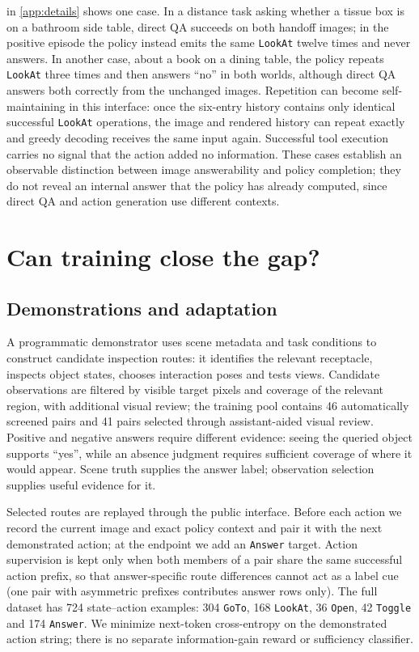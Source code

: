 \documentclass{article}
\begin{document}
 in \cref{app:details} shows one case. In a distance task asking whether a tissue box is on a bathroom side table, direct QA succeeds on both handoff images; in the positive episode the policy instead emits the same \texttt{LookAt} twelve times and never answers. In another case, about a book on a dining table, the policy repeats \texttt{LookAt} three times and then answers ``no'' in both worlds, although direct QA answers both correctly from the unchanged images. Repetition can become self-maintaining in this interface: once the six-entry history contains only identical successful \texttt{LookAt} operations, the image and rendered history can repeat exactly and greedy decoding receives the same input again. Successful tool execution carries no signal that the action added no information. These cases establish an observable distinction between image answerability and policy completion; they do not reveal an internal answer that the policy has already computed, since direct QA and action generation use different contexts.

\section{Can training close the gap?}
\label{sec:training}

\subsection{Demonstrations and adaptation}
A programmatic demonstrator uses scene metadata and task conditions to construct candidate inspection routes: it identifies the relevant receptacle, inspects object states, chooses interaction poses and tests views. Candidate observations are filtered by visible target pixels and coverage of the relevant region, with additional visual review; the training pool contains 46 automatically screened pairs and 41 pairs selected through assistant-aided visual review. Positive and negative answers require different evidence: seeing the queried object supports ``yes'', while an absence judgment requires sufficient coverage of where it would appear. Scene truth supplies the answer label; observation selection supplies useful evidence for it.

Selected routes are replayed through the public interface. Before each action we record the current image and exact policy context and pair it with the next demonstrated action; at the endpoint we add an \texttt{Answer} target. Action supervision is kept only when both members of a pair share the same successful action prefix, so that answer-specific route differences cannot act as a label cue (one pair with asymmetric prefixes contributes answer rows only). The full dataset has 724 state--action examples: 304 \texttt{GoTo}, 168 \texttt{LookAt}, 36 \texttt{Open}, 42 \texttt{Toggle} and 174 \texttt{Answer}. We minimize next-token cross-entropy on the demonstrated action string; there is no separate information-gain reward or sufficiency classifier.
\end{document}
